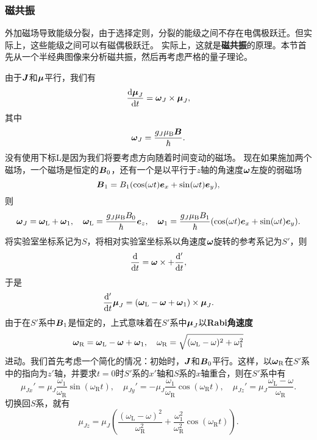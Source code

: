 \documentclass[UTF8, a4paper]{ctexart}
\begin{document}
\subsubsection{磁共振}

外加磁场导致能级分裂，由于选择定则，分裂的能级之间不存在电偶极跃迁。但实际上，这些能级之间可以有磁偶极跃迁。
实际上，这就是\textbf{磁共振}的原理。本节首先从一个半经典图像来分析磁共振，然后再考虑严格的量子理论。

由于$\vb*{J}$和$\vb*{\mu}$平行，我们有
\[
    \dv{\vb*{\mu}_J}{t} = \vb*{\omega}_J \times \vb*{\mu}_J,
\]
其中
\[
    \vb*{\omega}_J = \frac{g_J \mu_\text{B} \vb*{B}}{\hbar}.
\]
没有使用下标L是因为我们将要考虑方向随着时间变动的磁场。
现在如果施加两个磁场，一个磁场是恒定的$\vb*{B}_0$，还有一个是以平行于$z$轴的角速度$\vb*{\omega}$左旋的弱磁场
\begin{equation}
    \vb*{B}_1 = B_1 (\cos(\omega t) \vb*{e}_x + \sin(\omega t) \vb*{e}_y),
\end{equation}
则
\begin{equation}
    \vb*{\omega}_J = \vb*{\omega}_\text{L} + \vb*{\omega}_{1}, \quad \vb*{\omega}_\text{L} = \frac{g_J \mu_\text{B} B_0}{\hbar} \vb*{e}_z, \quad \vb*{\omega}_1 = \frac{g_J \mu_\text{B} B_1}{\hbar} (\cos(\omega t) \vb*{e}_x + \sin (\omega t) \vb*{e}_y).
\end{equation}
将实验室坐标系记为$S$，将相对实验室坐标系以角速度$\vb*{\omega}$旋转的参考系记为$S'$，则
\[
    \dv{t} = \vb*{\omega} \times + \dv'{t},
\]
于是
\[
    \dv'{t} \vb*{\mu}_J = (\vb*{\omega}_\text{L} - \vb*{\omega} + \vb*{\omega}_1) \times \vb*{\mu}_J.
\]
由于在$S'$系中$\vb*{B}_1$是恒定的，上式意味着在$S'$系中$\vb*{\mu}_J$以\textbf{Rabi角速度}
\begin{equation}
    \vb*{\omega}_\text{R} = \vb*{\omega}_\text{L} - \vb*{\omega} + \vb*{\omega}_1, \quad \omega_\text{R} = \sqrt{(\omega_\text{L} - \omega)^2 + \omega_1^2}
\end{equation}
进动。我们首先考虑一个简化的情况：初始时，$\vb*{J}$和$\vb*{B}_0$平行。这样，以$\vb*{\omega}_\text{R}$在$S'$系中的指向为$z'$轴，并要求$t=0$时$S'$系的$x'$轴和$S$系的$x$轴重合，则在$S'$系中有
\begin{equation}
    \mu_{Jx}' = \mu_J \frac{\omega_1}{\omega_\text{R}} \sin (\omega_\text{R} t), \quad \mu_{Jy}' = - \mu_J \frac{\omega_1}{\omega_\text{R}} \cos (\omega_\text{R} t), \quad \mu_{Jz}' = \mu_J \frac{\omega_\text{L} - \omega}{\omega_\text{R}}.
\end{equation}
切换回$S$系，就有
\begin{equation}
    \mu_{Jz} = \mu_J \left( \frac{(\omega_\text{L} - \omega)^2}{\omega_\text{R}^2} + \frac{\omega_1^2}{\omega_\text{R}^2} \cos (\omega_\text{R} t) \right).
\end{equation}
\end{document}
